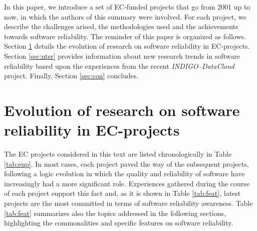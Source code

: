 \documentclass[journal]{IEEEtran}
\begin{document}
In this paper, we introduce a set of EC-funded projects
that go from 2001 up to now, in which the authors of this summary were involved.
For each project, we describe the challenges arised, the methodologies used and
the achievements towards software reliability. The reminder of this paper is
organized as follows. Section \ref{sec:ev} details the evolution of research on
software reliability in EC-projects. Section \ref{sec:ntsr} provides
information about new research trends in software reliability based upon the 
experiences from the recent {\sl INDIGO--DataCloud} project. Finally, Section \ref{sec:con} concludes.

\section{Evolution of research on software reliability in EC-projects}
\label{sec:ev}

The EC projects considered in this text are listed chronologically in Table
\ref{tab:eup}. In most cases, each project paved the way of the subsequent projects,
following a logic evolution in which the quality and reliability of software have
increasingly had a more significant role. Experiences gathered during the 
course of each project support this fact and, as it is shown in Table \ref{tab:feat},
latest projects are the most committed in terms of software reliability awareness.
Table \ref{tab:feat} summarizes also the topics addressed in the following sections, highlighting 
the commonalities and specific features on software reliability.
\end{document}
